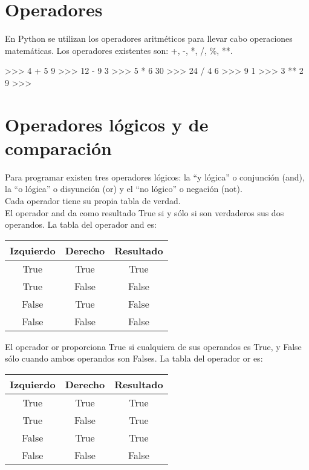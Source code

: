\section{Operadores}

En Python se utilizan los operadores aritméticos para llevar cabo operaciones matemáticas. Los operadores existentes son: +, -, *, /, \%, **.

\begin{pyglist} [language=python]
>>> 4 + 5
9
>>> 12 - 9
3
>>> 5 * 6
30
>>> 24 / 4
6
>>> 9 %
1
>>> 3 ** 2
9
>>>
\end{pyglist}

\section{Operadores lógicos y de comparación}

Para programar existen tres operadores lógicos: la ``y lógica'' o conjunción (and), la ``o lógica'' o disyunción (or) y el ``no lógico'' o negación (not).\\

Cada operador tiene su propia tabla de verdad.\\

El operador and da como resultado True si y sólo si son verdaderos sus dos operandos. La tabla del operador and es:\\

\begin{table}[h]
\centering
\begin{tabular}{|c|c|c|} \hline
Izquierdo    & Derecho & Resultado   \\ \hline
True         & True    &   True      \\ \hline
True         & False   &   False     \\ \hline
False        & True    &   False     \\ \hline
False        & False   &   False     \\ \hline
\end{tabular}
\end{table}

El operador or proporciona True si cualquiera de sus operandos es True, y False sólo cuando ambos operandos son Falses. La tabla del operador or es:\\

\begin{table}[h]
\centering
\begin{tabular}{|c|c|c|} \hline
Izquierdo    & Derecho & Resultado     \\ \hline
True         & True    &   True      \\ \hline
True         & False   &   True      \\ \hline
False         & True   &   True     \\ \hline
False         & False  &   False     \\ \hline       
\end{tabular}
\end{table}

